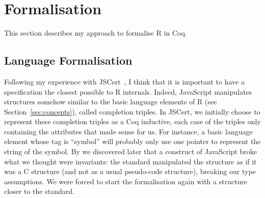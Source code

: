 \documentclass{article}
\newcommand\Coq{Coq}
\newcommand\R{R}
\newcommand\Cn{C}
\begin{document}
\section{Formalisation}
\label{sec:formalisation}

This section describes my approach to formalise \R{} in \Coq{}.

\subsection{Language Formalisation}
\label{sec:language:formalisation}

Following my experience with JSCert~\parencite{bodin2014trusted},
I think that it is important to have a specification
the closest possible to \R{} internals.
Indeed, JavaScript manipulates structures somehow similar
to the basic language elements of \R{} (see Section~\ref{sec:concepts}),
called completion triples.
In JSCert, we initially choose to represent these completion triples
as a \Coq{} inductive,
each case of the triples only containing the attributes that made sense for us.
For instance, a basic language element whose tag is “symbol”
will probably only use one pointer to represent the string of the symbol.
By we discovered later that a construct of JavaScript %
broke what we thought were invariants:
the standard manipulated the structure as if it was a \Cn{} structure
(and not as a usual pseudo-code structure),
breaking our type assumptions.
We were forced to start the formalisation again with a structure
closer to the standard.
\end{document}
